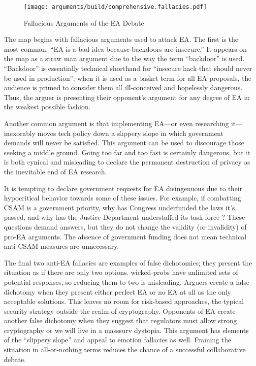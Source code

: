 \documentclass{IEEEtran}
\begin{document}
\begin{figure*}[t!]
  \centering
  \texttt{[image: arguments/build/comprehensive.fallacies.pdf]}
  \caption{Fallacious Arguments of the EA Debate}
  \label{fig-arg-fallacies}
\end{figure*}

The map begins with fallacious arguments used to attack \ac{EA}. The first is the most common: ``\ac{EA} is a bad idea
because backdoors are insecure.'' It appears on the map as a straw man argument due to the way the term ``backdoor'' is
used. ``Backdoor'' is essentially technical shorthand for ``insecure hack that should never be used in production'';
when it is used as a basket term for all \ac{EA} proposals, the audience is primed to consider them all ill-conceived
and hopelessly dangerous. Thus, the arguer is presenting their opponent's argument for any degree of \ac{EA} in the
weakest possible fashion.

Another common argument is that implementing \ac{EA}---or even researching it---inexorably moves tech policy down a
slippery slope in which government demands will never be satisfied. This argument can be used to discourage those
seeking a middle ground. Going too far and too fast is certainly dangerous, but it is both cynical and misleading to
declare the permanent destruction of privacy as the inevitable end of \ac{EA} research.

It is tempting to declare government requests for \ac{EA} disingenuous due to their hypocritical behavior towards some
of these issues. For example, if combatting \ac{CSAM} is a government priority, why has Congress underfunded the laws
it's passed, and why has the Justice Department understaffed its task force \cite{keller_internet_2019}? These questions
demand answers, but they do not change the validity (or invalidity) of pro-\ac{EA} arguments. The absence of government
funding does not mean technical anti-\ac{CSAM} measures are unnecessary.

The final two anti-\ac{EA} fallacies are examples of false dichotomies; they present the situation as if there are only
two options. \Acp{wicked-prob} have unlimited sets of potential responses, so reducing them to two is misleading.
Arguers create a false dichotomy when they present either perfect \ac{EA} or no \ac{EA} at all as the only acceptable
solutions. This leaves no room for risk-based approaches, the typical security strategy outside the realm of
cryptography. Opponents of \ac{EA} create another false dichotomy when they suggest that regulators must allow strong
cryptography or we will live in a \ac{masssurv} dystopia. This argument has elements of the ``slippery slope'' and
appeal to emotion fallacies as well. Framing the situation in all-or-nothing terms reduces the chance of a successful
collaborative debate.
\end{document}
